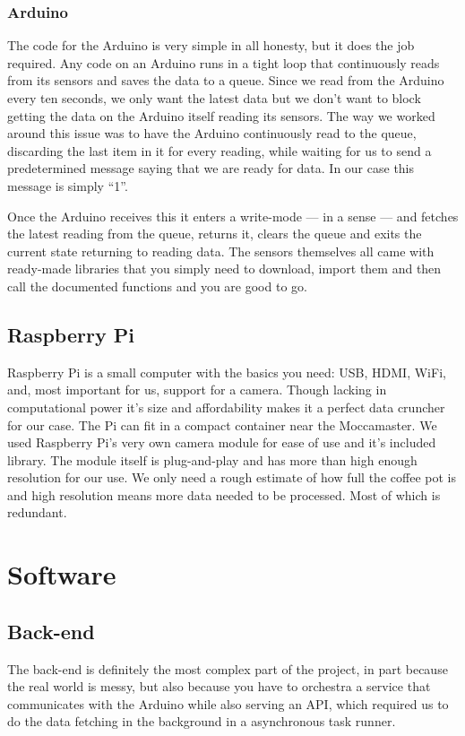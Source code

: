 \documentclass[12pt,a4paper,oneside,article]{memoir}
\numberwithin{equation}{chapter}
\begin{document}
\subsubsection{Arduino}\label{sec:arduino}
The code for the Arduino is very simple in all honesty, but it does the job
required. Any code on an Arduino runs in a tight loop that continuously reads
from its sensors and saves the data to a queue. Since we read from the Arduino
every ten seconds, we only want the latest data but we don't want to block
getting the data on the Arduino itself reading its sensors. The way we worked
around this issue was to have the Arduino continuously read to the queue,
discarding the last item in it for every reading, while waiting for us to send a
predetermined message saying that we are ready for data. In our case this
message is simply ``1''.

Once the Arduino receives this it enters a write-mode --- in a sense --- and
fetches the latest reading from the queue, returns it, clears the queue and
exits the current state returning to reading data. The sensors themselves all
came with ready-made libraries that you simply need to download, import them and
then call the documented functions and you are good to go.


\subsection{Raspberry Pi}\label{sec:raspberry-pi}
Raspberry Pi is a small computer with the basics you need: USB, HDMI, WiFi, 
and, most important for us, support for a camera. Though lacking in 
computational power it's size and affordability makes it a perfect data 
cruncher for our case. The Pi can fit in a compact container near the 
Moccamaster. We used Raspberry Pi's very own camera module for ease of use and 
it's included library. The module itself is plug-and-play and has more than high 
enough resolution for our use. We only need a rough estimate of how full the 
coffee pot is and high resolution means more data needed to be processed. Most 
of which is redundant. 

\section{Software}\label{sec:software}
\subsection{Back-end}\label{sec:back-end}
The back-end is definitely the most complex part of the project, in part because
the real world is messy, but also because you have to orchestra a service that
communicates with the Arduino while also serving an API, which required us to do
the data fetching in the background in a asynchronous task runner.
\end{document}
